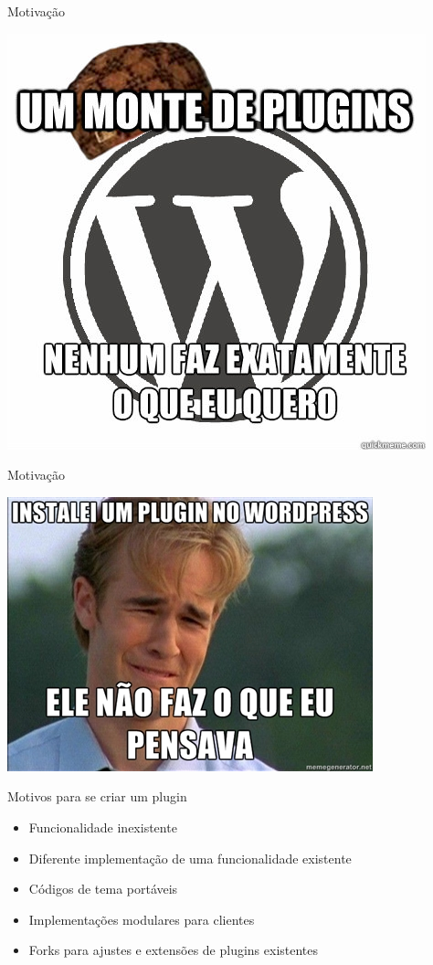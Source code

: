 \documentclass{beamer}
\begin{document}
\begin{frame}{Motivação}
\begin{center}
  \includegraphics[height=0.8\textheight]{./img/plugins.jpg}
\end{center}
\end{frame}

\begin{frame}{Motivação}
\begin{center}
  \includegraphics[height=0.8\textheight]{./img/plugins-install.jpg}
\end{center}
\end{frame}

\begin{frame}{Motivos para se criar um plugin}
\begin{itemize}
  \pause \item Funcionalidade inexistente
  \pause \item Diferente implementação de uma funcionalidade existente
  \pause \item Códigos de tema portáveis
  \pause \item Implementações modulares para clientes
  \pause \item Forks para ajustes e extensões de plugins existentes
\end{itemize}
\end{frame}
\end{document}
